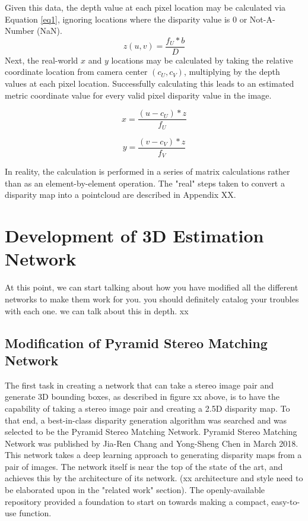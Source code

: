 Given this data, the depth value at each pixel location may be calculated via Equation \ref{eq1}, ignoring locations where the disparity value is 0 or Not-A-Number (NaN).
\begin{equation}
z(u,v) = \frac{f_U * b}{D}
\label{eq1}
\end{equation}
Next, the real-world $x$ and $y$ locations may be calculated by taking the relative coordinate location from camera center $(c_U,c_V)$, multiplying by the depth values at each pixel location. Successfully calculating this leads to an estimated metric coordinate value for every valid pixel disparity value in the image.

\begin{equation}
x = \frac{(u - c_U) * z}{f_U}
\end{equation}

\begin{equation}
y = \frac{(v - c_V) * z}{f_V}
\end{equation}

In reality, the calculation is performed in a series of matrix calculations rather than as an element-by-element operation. The "real" steps taken to convert a disparity map into a pointcloud are described in Appendix XX.


\section{Development of 3D Estimation Network}
At this point, we can start talking about how you have modified all the different networks to make them work for you. you should definitely catalog your troubles with each one. we can talk about this in depth. xx

\subsection{Modification of Pyramid Stereo Matching Network}
The first task in creating a network that can take a stereo image pair and generate 3D bounding boxes, as described in figure xx above, is to have the capability of taking a stereo image pair and creating a 2.5D disparity map. To that end, a best-in-class disparity generation algorithm was searched and was selected to be the Pyramid Stereo Matching Network. Pyramid Stereo Matching Network was published by Jia-Ren Chang and Yong-Sheng Chen in March 2018. This network takes a deep learning approach to generating disparity maps from a pair of images. The network itself is near the top of the state of the art, and achieves this by the architecture of its network. (xx architecture and style need to be elaborated upon in the "related work" section). The openly-available repository provided a foundation to start on towards making a compact, easy-to-use function.

